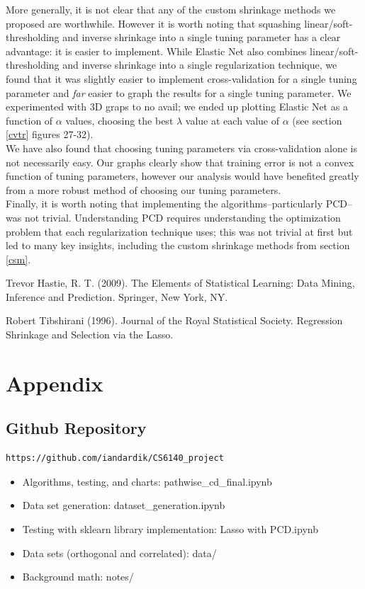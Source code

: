 \documentclass[11pt]{article}
\begin{document}
More generally, it is not clear that any of the custom shrinkage methods we proposed are worthwhile.  However it is worth noting that squashing linear/soft-thresholding and inverse shrinkage into a single tuning parameter has a clear advantage: it is easier to implement.  While Elastic Net also combines linear/soft-thresholding and inverse shrinkage into a single regularization technique, we found that it was slightly easier to implement cross-validation for a single tuning parameter and \textit{far} easier to graph the results for a single tuning parameter.  We experimented with 3D graps to no avail; we ended up plotting Elastic Net as a function of $\alpha$ values, choosing the best $\lambda$ value at each value of $\alpha$ (see section \ref{cvtr} figures 27-32).  \\

We have also found that choosing tuning parameters via cross-validation alone is not necessarily easy.  Our graphs clearly show that training error is not a convex function of tuning parameters, however our analysis would have benefited greatly from a more robust method of choosing our tuning parameters.  \\

Finally, it is worth noting that implementing the algorithms--particularly PCD--was not trivial.  Understanding PCD requires understanding the optimization problem that each regularization technique uses; this was not trivial at first but led to many key insights, including the custom shrinkage methods from section \ref{csm}.  


\begin{thebibliography}{9}
Trevor Hastie, R. T. (2009). The Elements of Statistical Learning: Data Mining, Inference and Prediction. Springer, New York, NY.

Robert Tibshirani (1996).  Journal of the Royal Statistical Society.  Regression Shrinkage and Selection via the Lasso. 

\end{thebibliography}

\section{Appendix}

\subsection{Github Repository}
\begin{verbatim}
https://github.com/iandardik/CS6140_project
\end{verbatim}
\begin{itemize}
	\item Algorithms, testing, and charts: pathwise\_cd\_final.ipynb
	\item Data set generation: dataset\_generation.ipynb
	\item Testing with sklearn library implementation: Lasso with PCD.ipynb
	\item Data sets (orthogonal and correlated): data/
	\item Background math: notes/
\end{itemize}
\end{document}
